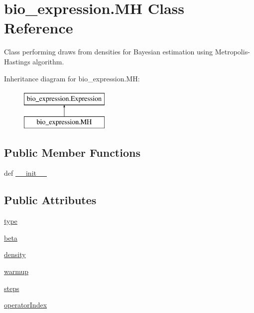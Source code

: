 \hypertarget{classbio__expression_1_1_m_h}{\section{bio\+\_\+expression.\+M\+H Class Reference}
\label{classbio__expression_1_1_m_h}
}


Class performing draws from densities for Bayesian estimation using Metropolis-\/\+Hastings algorithm.  


Inheritance diagram for bio\+\_\+expression.\+M\+H\+:\begin{figure}[H]
\begin{center}
\leavevmode
\includegraphics[height=2.000000cm]{d5/d9a/classbio__expression_1_1_m_h}
\end{center}
\end{figure}
\subsection*{Public Member Functions}
\begin{DoxyCompactItemize}
\item 
def \hyperlink{classbio__expression_1_1_m_h_ad76ec4692692727e12960affad84dfc8}{\+\_\+\+\_\+init\+\_\+\+\_\+}
\end{DoxyCompactItemize}
\subsection*{Public Attributes}
\begin{DoxyCompactItemize}
\item 
\hyperlink{classbio__expression_1_1_m_h_a48c07484d5abd341e38f82bd8ef43b0c}{type}
\item 
\hyperlink{classbio__expression_1_1_m_h_a767bb48ec82475fb60d73d297f6f722d}{beta}
\item 
\hyperlink{classbio__expression_1_1_m_h_a5a3443d482b7fd5afa1f4b9ea1b3586a}{density}
\item 
\hyperlink{classbio__expression_1_1_m_h_a56901e6f39d9fc5a25b97c2f8c5f4e23}{warmup}
\item 
\hyperlink{classbio__expression_1_1_m_h_a78adda7cb0d4557dbb12620ed5577621}{steps}
\item 
\hyperlink{classbio__expression_1_1_m_h_af6d51b6718c53ba42e71f5071850fe06}{operator\+Index}
\end{DoxyCompactItemize}


